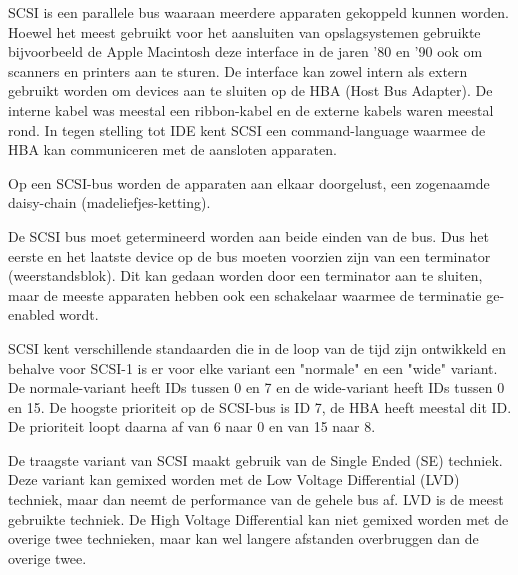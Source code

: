 SCSI is een parallele bus waaraan meerdere apparaten gekoppeld kunnen worden. Hoewel het meest gebruikt voor het aansluiten van opslagsystemen gebruikte bijvoorbeeld de Apple Macintosh deze interface in de jaren '80 en '90 ook om scanners en printers aan te sturen. De interface kan zowel intern als extern gebruikt worden om devices aan te sluiten op de HBA (Host Bus Adapter). De interne kabel was meestal een ribbon-kabel en de externe kabels waren meestal rond. In tegen stelling tot IDE kent SCSI een command-language waarmee de HBA kan communiceren met de aansloten apparaten.

Op een SCSI-bus worden de apparaten aan elkaar doorgelust, een zogenaamde daisy-chain (madeliefjes-ketting).

De SCSI bus moet getermineerd worden aan beide einden van de bus. Dus het eerste en het laatste device op de bus moeten voorzien zijn van een terminator (weerstandsblok). Dit kan gedaan worden door een terminator aan te sluiten, maar de meeste apparaten hebben ook een schakelaar waarmee de terminatie ge-enabled wordt.

SCSI kent verschillende standaarden die in de loop van de tijd zijn ontwikkeld en behalve voor SCSI-1 is er voor elke variant een "normale" en een "wide" variant. De normale-variant heeft IDs tussen 0 en 7 en de wide-variant heeft IDs tussen 0 en 15. De hoogste prioriteit op de SCSI-bus is ID 7, de HBA heeft meestal dit ID. De prioriteit loopt daarna af van 6 naar 0 en van 15 naar 8.

De traagste variant van SCSI maakt gebruik van de Single Ended (SE) techniek. Deze variant kan gemixed worden met de Low Voltage Differential (LVD) techniek, maar dan neemt de performance van de gehele bus af. LVD is de meest gebruikte techniek. De High Voltage Differential kan niet gemixed worden met de overige twee technieken, maar kan wel langere afstanden overbruggen dan de overige twee.

